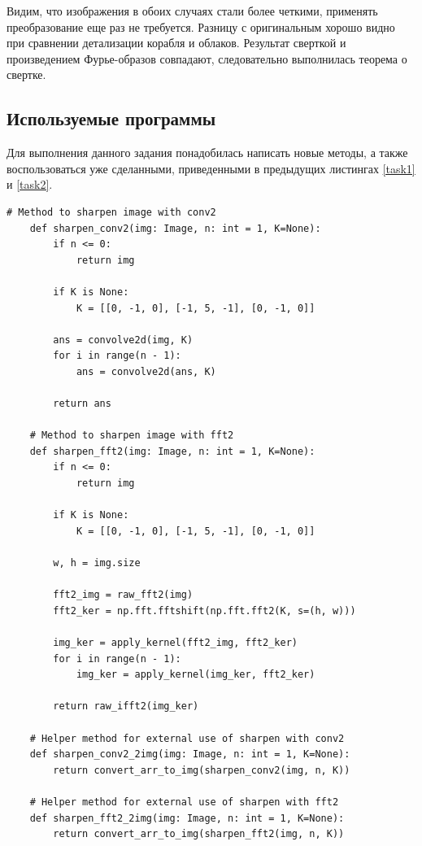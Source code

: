\documentclass[a4paper, 12pt]{article}
\begin{document}
    Видим, что изображения в обоих случаях стали более четкими, применять преобразование еще раз не требуется. Разницу с оригинальным хорошо видно при сравнении детализации
    корабля и облаков. Результат сверткой и произведением Фурье-образов совпадают, следовательно выполнилась теорема о свертке.


    \subsection{Используемые программы}
    Для выполнения данного задания понадобилась написать новые методы, а также воспользоваться уже сделанными, приведенными
    в предыдущих листингах \ref{task1} и \ref{task2}.
    \begin{lstlisting}[label=task3, caption={Программные методы, необходимые для задания 3}]
    # Method to sharpen image with conv2
    def sharpen_conv2(img: Image, n: int = 1, K=None):
        if n <= 0:
            return img

        if K is None:
            K = [[0, -1, 0], [-1, 5, -1], [0, -1, 0]]

        ans = convolve2d(img, K)
        for i in range(n - 1):
            ans = convolve2d(ans, K)

        return ans
    
    # Method to sharpen image with fft2
    def sharpen_fft2(img: Image, n: int = 1, K=None):
        if n <= 0:
            return img

        if K is None:
            K = [[0, -1, 0], [-1, 5, -1], [0, -1, 0]]

        w, h = img.size

        fft2_img = raw_fft2(img)
        fft2_ker = np.fft.fftshift(np.fft.fft2(K, s=(h, w)))
        
        img_ker = apply_kernel(fft2_img, fft2_ker)
        for i in range(n - 1):
            img_ker = apply_kernel(img_ker, fft2_ker)

        return raw_ifft2(img_ker)

    # Helper method for external use of sharpen with conv2
    def sharpen_conv2_2img(img: Image, n: int = 1, K=None):
        return convert_arr_to_img(sharpen_conv2(img, n, K))
    
    # Helper method for external use of sharpen with fft2
    def sharpen_fft2_2img(img: Image, n: int = 1, K=None):
        return convert_arr_to_img(sharpen_fft2(img, n, K))
    \end{lstlisting}
\end{document}
